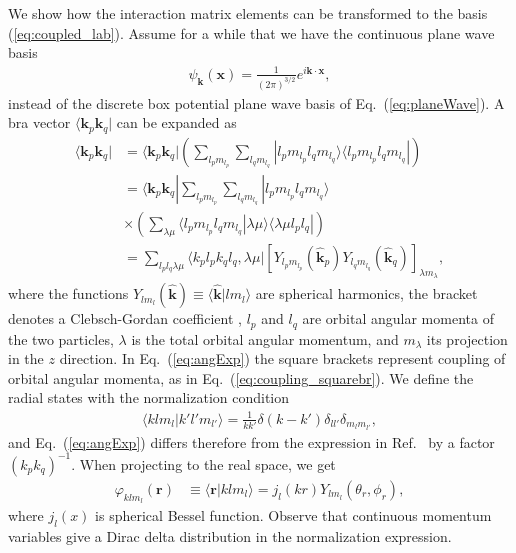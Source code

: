 \documentclass[a4paper,12pt]{report}
\begin{document}
We show how the interaction matrix elements can
be transformed to the basis (\ref{eq:coupled_lab}).  Assume 
for a while that we have the continuous plane wave basis 
\begin{align} \label{eq:planew_c}
  \psi_{\mathbf{k}}(\mathbf{x})=\frac{1}{(2\pi )^{3/2}}
  e^{i\mathbf{k}\cdot \mathbf{x}},
\end{align}
instead of the discrete box potential plane wave basis of 
Eq.~(\ref{eq:planeWave}). A bra vector 
$\langle \mathbf{k}_{p}\mathbf{k}_{q}|$ can be expanded as \cite{wong1972}
\begin{align} \label{eq:angExp}
  \langle \mathbf{k}_{p}\mathbf{k}_{q}| &= \langle \mathbf{k}_{p}\mathbf{k}_{q}|
  \left( \sum_{l_{p}m_{l_{p}}}\sum_{l_{q}m_{l_{q}}}|l_{p}m_{l_{p}}l_{q}m_{l_{q}}\rangle
  \langle l_{p}m_{l_{p}}l_{q}m_{l_{q}}| \right) \nonumber \\
  &= \langle \mathbf{k}_{p}\mathbf{k}_{q}|\sum_{l_{p}m_{l_{p}}}\sum_{l_{q}m_{l_{q}}}
  |l_{p}m_{l_{p}}l_{q}m_{l_{q}}\rangle \nonumber \\
  & \times \left( \sum_{\lambda \mu } \langle l_{p}m_{l_{p}}l_{q}m_{l_{q}}|
      \lambda \mu \rangle \langle \lambda \mu l_{p}l_{q}| \right) \nonumber \\
  &= \sum_{l_{p}l_{q}\lambda \mu }\langle k_{p}l_{p}k_{q}l_{q},\lambda \mu |
      \left[ Y_{l_{p}m_{l_{p}}}(\mathbf{\hat{k}}_{p})
        Y_{l_{q}m_{l_{q}}}(\mathbf{\hat{k}}_{q})\right]_{\lambda m_{\lambda } },
\end{align} 
where the functions 
$Y_{lm_{l}}(\mathbf{\hat{k}}) \equiv \langle \mathbf{\hat{k}}|lm_{l}\rangle $ 
are spherical harmonics, the bracket denotes a Clebsch-Gordan 
coefficient \cite{varshalovich}, $l_{p}$ and $l_{q}$ are orbital angular 
momenta of the two particles, $\lambda $ is the total orbital angular 
momentum, and $m_{\lambda } $ its projection in the $z$ direction.
In Eq.~(\ref{eq:angExp}) the square brackets represent coupling
of orbital angular momenta, as in 
Eq.~(\ref{eq:coupling_squarebr}). We define the radial
states with the normalization condition
\begin{align} \label{eq:radial_norm2}
  \langle klm_{l}|k'l'm_{l'}\rangle = 
  \frac{1}{kk'}\delta(k-k')\delta_{ll'}\delta_{m_{l}m_{l'}},
\end{align} 
and Eq.~(\ref{eq:angExp}) differs therefore from the expression 
in Ref.~\cite{wong1972} by a factor $(k_{p}k_{q})^{-1}$. When
projecting to the real space, we get \cite{liboff}
\begin{align}
  \varphi_{klm_{l}}(\mathbf{r}) &\equiv 
  \langle \mathbf{r}|klm_{l}\rangle = 
  j_{l}(kr)Y_{lm_{l}}(\theta_{r} ,\phi_{r} ),
\end{align}
where $j_{l}(x)$ is spherical Bessel function.  
Observe that continuous momentum variables give a Dirac delta 
distribution in the normalization expression. 
\end{document}
